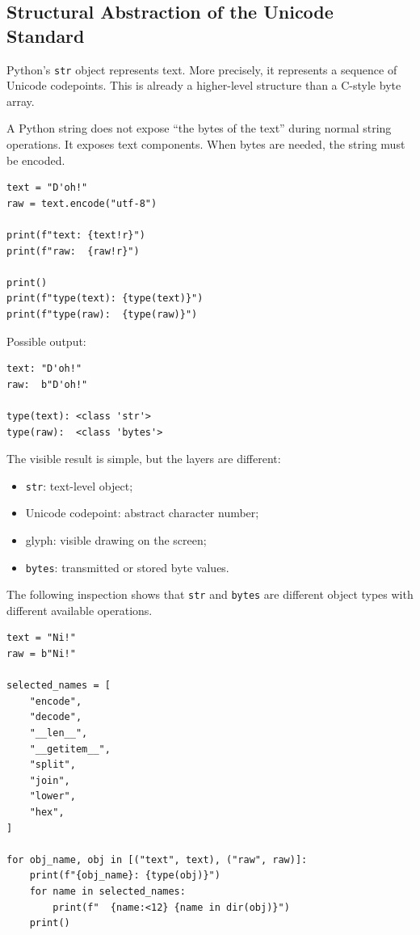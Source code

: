 \subsection{Structural Abstraction of the Unicode Standard}

Python's \texttt{str} object represents text. More precisely, it represents a sequence of Unicode codepoints. This is already a higher-level structure than a C-style byte array.

A Python string does not expose ``the bytes of the text'' during normal string operations. It exposes text components. When bytes are needed, the string must be encoded.

\begin{verbatim}
text = "D'oh!"
raw = text.encode("utf-8")

print(f"text: {text!r}")
print(f"raw:  {raw!r}")

print()
print(f"type(text): {type(text)}")
print(f"type(raw):  {type(raw)}")
\end{verbatim}

Possible output:

\begin{verbatim}
text: "D'oh!"
raw:  b"D'oh!"

type(text): <class 'str'>
type(raw):  <class 'bytes'>
\end{verbatim}

The visible result is simple, but the layers are different:

\begin{itemize}
    \item \texttt{str}: text-level object;
    \item Unicode codepoint: abstract character number;
    \item glyph: visible drawing on the screen;
    \item \texttt{bytes}: transmitted or stored byte values.
\end{itemize}

The following inspection shows that \texttt{str} and \texttt{bytes} are different object types with different available operations.

\begin{verbatim}
text = "Ni!"
raw = b"Ni!"

selected_names = [
    "encode",
    "decode",
    "__len__",
    "__getitem__",
    "split",
    "join",
    "lower",
    "hex",
]

for obj_name, obj in [("text", text), ("raw", raw)]:
    print(f"{obj_name}: {type(obj)}")
    for name in selected_names:
        print(f"  {name:<12} {name in dir(obj)}")
    print()
\end{verbatim}

